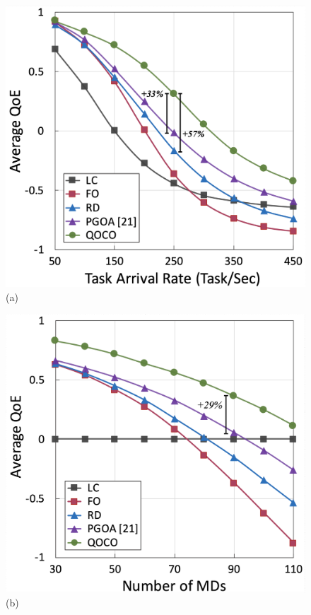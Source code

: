 \begin{frame}
	\begin{figure}
		\begin{minipage}[b]{0.47\linewidth}
			\centering
			\includegraphics[width=\textwidth]{444_} 
			\hspace{0.6cm}(a)
		\end{minipage}
		\hspace{-0.2cm}
		\begin{minipage}[b]{0.47\linewidth}
			\centering
			\includegraphics[width=\textwidth]{445_}
			\hspace{0.6cm}(b)
		\end{minipage}
		

\end{figure}
\end{frame}
